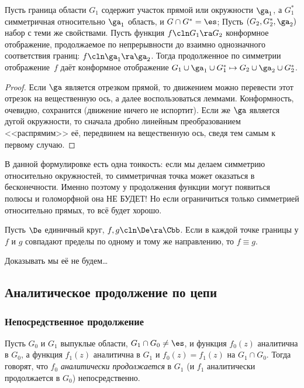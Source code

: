 \documentclass[a4paper]{article}
\begin{document}
\begin{theorem}
\begin{theorem}
Пусть граница области $G_1$ содержит участок прямой или окружности $\ga_1$, а $G_1^*$
симметричная относительно $\ga_1$ область, и $G \cap G^*=\es$;
Пусть $(G_2, G_2^*,\ga_2)$ набор с теми же свойствами. Пусть функция $f\cln G_1\ra G_2$ конформное
отображение, продолжаемое по непрерывности до взаимно однозначного соответствия границ: $f\cln \ga_1 \ra \ga_2$.
Тогда продолженное по симметрии отображение~$f$ даёт конформное отображение
$G_1\cup\ga_1\cup G_1^* \mapsto G_2\cup\ga_2\cup G_2^*$.
\end{theorem}
\begin{proof}
Если $\ga$ является отрезком прямой, то движением можно перевести этот отрезок на вещественную ось, а далее воспользоваться
леммами. Конформность, очевидно, сохранится (движение ничего не испортит). Если же $\ga$ является дугой окружности, то
сначала дробно линейным преобразованием <<распрямим>> её, передвинем на вещественную ось, сведя тем самым к первому случаю.
\end{proof}
\begin{note}
В данной формулировке есть одна тонкость: если мы делаем симметрию относительно окружностей,
то симметричная точка может оказаться в бесконечности. Именно поэтому у продолжения функции могут появиться полюсы
и голоморфной она НЕ БУДЕТ! Но если ограничиться только симметрией относительно прямых, то всё будет хорошо.
\end{note}

\begin{theorem}[И.\,И.\,Привалов, 1918]
Пусть $\De$ единичный круг, $f,g\cln \De \ra \Cbb$. Если в каждой точке границы
у $f$ и $g$ совпадают пределы по одному и тому же направлению, то $f\equiv g$.
\end{theorem}
Доказывать мы её не будем\dots

\subsection{Аналитическое продолжение по цепи}

\subsubsection{Непосредственное продолжение}

\begin{df}
Пусть $G_0$ и $G_1$ выпуклые области, $G_1 \cap G_0\neq \es$,  и функция $f_0(z)$ аналитична в $G_0$,
а функция $f_1(z)$ аналитична в $G_1$ и $f_0(z)=f_1(z)$ на $G_1 \cap G_0$. Тогда говорят, что $f_0$
\emph{аналитически продолжается} в $G_1$ (и $f_1$ аналитически продолжается в $G_0$) непосредственно.
\end{df}


\end{theorem}
\end{document}
